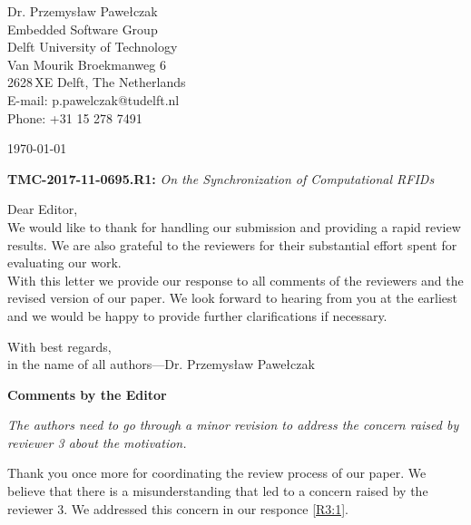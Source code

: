 \documentclass[10pt]{article}
\newcommand{\referee}[1]{
	{\item \color{OliveGreen} \emph{{#1}}}
	\label{R\therefereeCounter:\arabic{enumi}}
}
\newcommand{\response}[1]{{\color{blue} #1}}
\newenvironment{editor}{%
\textbf{\large Comments by the Editor}
\begin{enumerate}%
\renewcommand{\labelenumi}{\textbf{[E:\,\arabic{enumi}]}} %
}{ \end{enumerate}}
\newcounter{refereeCounter}
\begin{document}
\pagestyle{myheadings}
\thispagestyle{empty}


\headsep 0.5cm

\bigskip\bigskip


\bigskip\bigskip

\begin{flushright}
Dr. Przemys{\l}aw Pawe{\l}czak \\
Embedded Software Group \\ 
Delft University of Technology \\ 
Van Mourik Broekmanweg 6\\
2628\,XE Delft, The Netherlands \\
E-mail: p.pawelczak@tudelft.nl\\
Phone: +31 15 278 7491\\
\end{flushright}

\vspace*{2cm}

\today
\medskip


\textbf{TMC-2017-11-0695.R1:} {\sl On the Synchronization of Computational RFIDs}

\bigskip

Dear Editor,\\

We would like to thank for handling our submission and providing a rapid review results. We are also grateful to the reviewers for their substantial effort spent for evaluating our work. \\

With this letter we provide our response to all comments of the reviewers and the revised version of our paper. We look forward to hearing from you at the earliest and we would be happy to provide further clarifications if necessary.

With best regards, \\

in the name of all authors---Dr. Przemys{\l}aw Pawe{\l}czak

\pagebreak

\begin{editor}
\referee{The authors need to go through a minor revision to address the concern raised by reviewer 3 about the motivation.
}

\response{Thank you once more for coordinating the review process of our paper. We believe that there is a misunderstanding that led to a concern raised by the reviewer 3. We addressed this concern in our responce \hyperref[R3:1]{[R3:1]}.
}

\end{editor}
\end{document}
